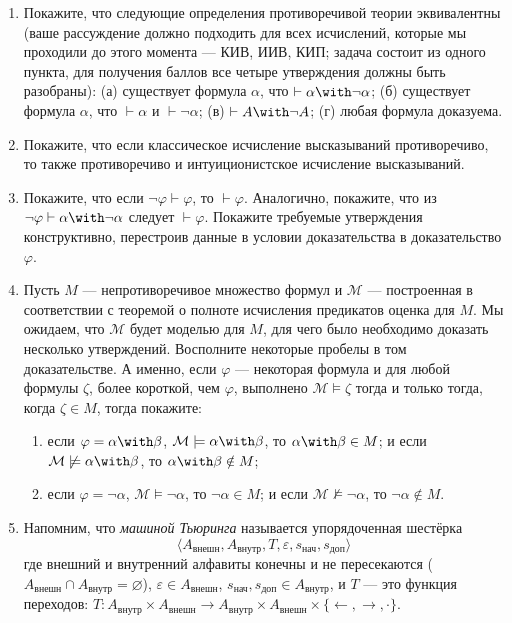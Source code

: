 \documentclass[10pt,a4paper,oneside]{article}
\begin{document}
\begin{enumerate}
\item Покажите, что следующие определения противоречивой теории эквивалентны (ваше рассуждение
должно подходить для всех исчислений, которые мы проходили до этого момента --- КИВ, ИИВ, КИП;
задача состоит из одного пункта, для получения баллов все четыре утверждения должны быть разобраны):
(а) существует формула $\alpha$, что $\vdash\alpha\with\neg\alpha$;
(б) существует формула $\alpha$, что $\vdash\alpha$ и $\vdash\neg\alpha$;
(в) $\vdash A \with \neg A$;
(г) любая формула доказуема.

\item Покажите, что если классическое исчисление высказываний противоречиво, то также противоречиво и интуиционистское исчисление высказываний.

\item Покажите, что если $\neg\varphi\vdash\varphi$, то $\vdash\varphi$. Аналогично, покажите, что из $\neg\varphi\vdash\alpha\with\neg\alpha$
следует $\vdash\varphi$. Покажите требуемые утверждения конструктивно, перестроив данные в условии доказательства в доказательство $\varphi$. 


\item Пусть $M$ --- непротиворечивое множество формул и $\mathcal{M}$ --- построенная в соответствии с теоремой о 
полноте исчисления предикатов оценка для $M$. Мы ожидаем, что $\mathcal{M}$ будет моделью для $M$, для чего было необходимо доказать
несколько утверждений. Восполните некоторые пробелы в том доказательстве. А именно, если $\varphi$ --- 
некоторая формула и для любой формулы $\zeta$, более короткой, чем $\varphi$, выполнено
$\mathcal{M}\models\zeta$ тогда и только тогда, когда $\zeta\in M$, тогда покажите:
\begin{enumerate}
\item если $\varphi = \alpha\with\beta$, $\mathcal{M}\models\alpha\with\beta$, то $\alpha\with\beta\in M$; и если $\mathcal{M}\not\models\alpha\with\beta$, то $\alpha\with\beta\notin M$;
\item если $\varphi = \neg\alpha$, $\mathcal{M}\models\neg\alpha$, то $\neg\alpha\in M$; и если $\mathcal{M}\not\models\neg\alpha$, то $\neg\alpha\notin M$.
\end{enumerate}

\item 
Напомним, что \emph{машиной Тьюринга} называется упорядоченная шестёрка $$\langle A_\text{внешн}, A_\text{внутр}, T, \varepsilon, s_\text{нач}, s_\text{доп}\rangle$$
где внешний и внутренний алфавиты конечны и не пересекаются ($A_\text{внешн} \cap A_\text{внутр} = \varnothing$), $\varepsilon \in A_\text{внешн}$, $s_\text{нач}, s_\text{доп} \in A_\text{внутр}$, 
и $T$ --- это функция переходов: $T : A_\text{внутр} \times A_\text{внешн} \rightarrow A_\text{внутр} \times A_\text{внешн} \times \{ \leftarrow, \rightarrow, \cdot \}$.


\end{enumerate}
\end{document}
